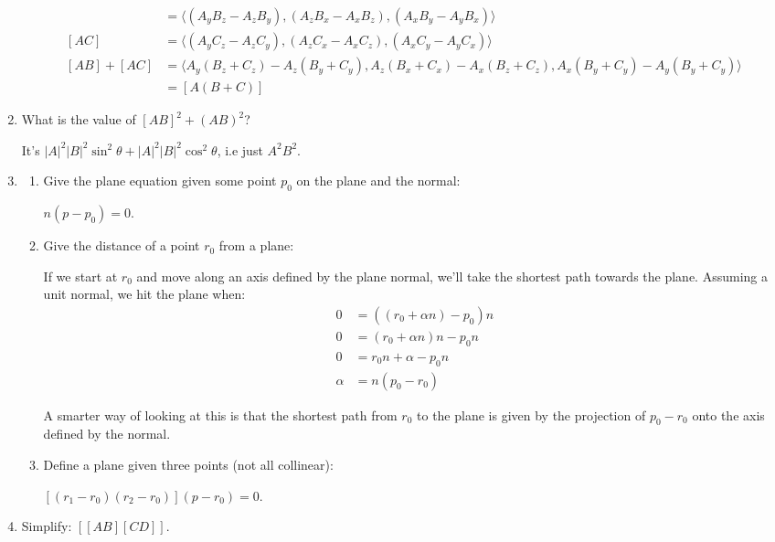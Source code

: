 \documentclass{article}
\newcommand{\tuple}[1]{\langle #1 \rangle}
\begin{document}
\begin{enumerate}[1)]
        \begin{align*}
            [AB] &= \tuple{(A_yB_z - A_zB_y), (A_zB_x - A_xB_z), (A_xB_y -
            A_yB_x)} \\
            [AC] &= \tuple{(A_yC_z - A_zC_y), (A_zC_x - A_xC_z), (A_xC_y -
            A_yC_x)} \\
            [AB] + [AC] &= \tuple{A_y(B_z+C_z) - A_z(B_y+C_y),
                                  A_z(B_x+C_x) - A_x(B_z+C_z),
                                  A_x(B_y+C_y) - A_y(B_y+C_y)} \\
                        &= [A(B+C)]
        \end{align*}
    \item What is the value of $[AB]^2 + (AB)^2$?

        It's $|A|^2|B|^2\sin^2\theta + |A|^2|B|^2\cos^2\theta$, i.e just
        $A^2B^2$.

    \item
        \begin{enumerate}
            \item Give the plane equation given some point $p_0$ on the
                plane and the normal:

                $n(p - p_0) = 0$.
            \item Give the distance of a point $r_0$ from a plane:

                If we start at $r_0$ and move along an axis defined by the
                plane normal, we'll take the shortest path towards the
                plane. Assuming a unit normal, we hit the plane when:
                \begin{align*}
                    0 &= ((r_0 + \alpha n) - p_0)n \\
                    0 &= (r_0 + \alpha n)n - p_0n \\
                    0 &= r_0n + \alpha - p_0n \\
                    \alpha &= n(p_0 - r_0)
                \end{align*}

                A smarter way of looking at this is that the shortest path
                from $r_0$ to the plane is given by the projection of $p_0 -
                r_0$ onto the axis defined by the normal.
            \item Define a plane given three points (not all collinear):

                $[(r_1 - r_0)(r_2 - r_0)](p - r_0) = 0$.
        \end{enumerate}
    \item Simplify: $[[AB][CD]]$.


\end{enumerate}
\end{document}
